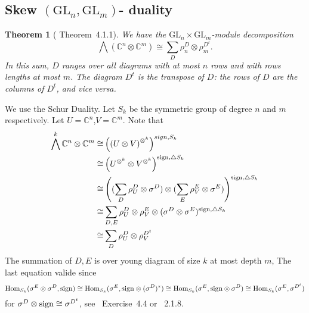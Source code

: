 \documentclass[12pt]{article}
\newtheorem{thm}{Theorem}
\def\sign{{\rm sign}}
\def\Hom{{\rm Hom}}
\def\bC{{\mathbb{C}}}
\def\GL{\mathrm{GL}}
\begin{document}
\subsection{Skew $(\GL_n,\GL_m)$- duality}
\begin{thm}[\cite{howe1995perspective} Theorem~4.1.1]
We have the $\GL_n\times \GL_m$-module decomposition
\[
\bigwedge ( \bC^n\otimes \bC^m)\cong \sum_{D}\rho^D_n\otimes \rho^{D^t}_m.
\]
In this sum, $D$ ranges over all diagrams with at most $n$ rows 
and with rows lengths at most $m$. The diagram $D^t$ is the transpose 
of $D$: the rows of $D$ are the columns of $D^t$, and vice versa.
\end{thm} 
\proof
We use the Schur Duality. Let $S_k$ be the symmetric group of degree $n$ and
$m$ respectively.
Let $U= \bC^n$,$V=\bC^m$.
Note that 
\[
\begin{split}
\bigwedge^k \bC^n\otimes \bC^m 
\cong&  \left(\left(U\otimes V\right)^{\otimes^k}\right)^{sign,S_k}\\
\cong&  \left(U^{\otimes^k} \otimes V^{\otimes^k}\right)^{\sign,\triangle S_k}\\
\cong& \left((\sum_{D}\rho_U^D\otimes \sigma^D)
  \otimes (\sum_{E}\rho_V^E\otimes\sigma^E)\right)^{\sign,\triangle S_k}\\
\cong& \sum_{D,E} \rho_U^D\otimes \rho_V^E 
\otimes (\sigma^D\otimes \sigma^E)^{\sign,\triangle S_k}\\
\cong& \sum_{D} \rho_U^D\otimes \rho_V^{D^t}
\end{split}
\]
The summation of $D,E$ is over young diagram of size $k$ at most depth $m$, 
The last equation valide since 
\[
\Hom_{S_k}(\sigma^E\otimes \sigma^D, \sign) 
\cong \Hom_{S_k}(\sigma^E, \sign\otimes (\sigma^D)^*)
\cong \Hom_{S_k}(\sigma^E,\sign\otimes \sigma^D)
\cong \Hom_{S_k}(\sigma^E,\sigma^{D^t})
\]
for $\sigma^D\otimes \sign \cong \sigma^{D^t}$, see \cite{Fulton1991}~Exercise~4.4 or \cite{James1981}~2.1.8.  
{}

\end{document}
